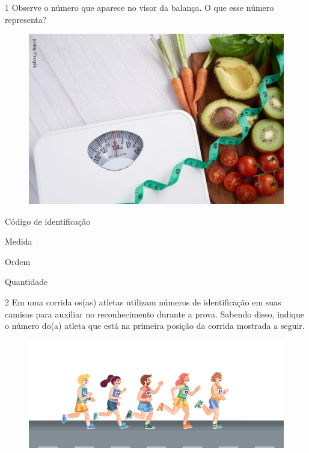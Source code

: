 \num{1} Observe o número que aparece no visor da balança. O que esse número
representa?

\begin{figure}[H]
\centering
\includegraphics[width=\textwidth]{./media/image137.png}
\end{figure}

\begin{escolha}[itemsep=-5pt]
\item Código de identificação

\item Medida

\item Ordem

\item Quantidade
\end{escolha}


\num{2} Em uma corrida os(as) atletas utilizam números de identificação em suas
camisas para auxiliar no reconhecimento durante a prova. Sabendo disso,
indique o número do(a) atleta que está na primeira posição da corrida
mostrada a seguir.

\begin{figure}[H]
\includegraphics[width=\textwidth]{./media/image138.png}
\end{figure}

